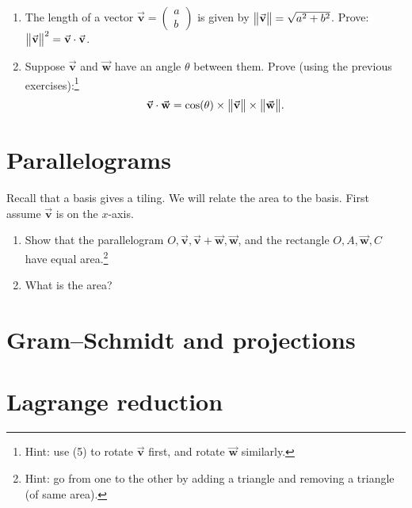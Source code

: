 \documentclass[10pt,a4paper]{article}
\newcommand{\twovec}[2]{\ensuremath{\begin{pmatrix}{#1}\\{#2}\end{pmatrix}}}
\newcommand{\V}[1]{\vec{\mathbf{#1}}}
\DeclarePairedDelimiter{\norm}{\big\lVert}{\big\rVert}
\begin{document}
\begin{enumerate}[label=(\arabic*)]
\item The length of a vector \(\V{v} = \twovec{a}{b}\) is given by \(\norm{\V{v}} = \sqrt{a^2 + b^2}\).
	Prove: \(\norm{\V{v}}^2 = \V{v} \cdot \V{v}\).

\item Suppose \(\V{v}\) and \(\V{w}\) have an angle \(\theta\) between them.
	Prove (using the previous exercises):\footnote{Hint: use (5) to rotate \(\V{v}\) first, and rotate \(\V{w}\) similarly.}
	\[\V{v} \cdot \V{w} = \cos(\theta) \times \norm{\V{v}} \times \norm{\V{w}}.\]
\end{enumerate}

\clearpage
\section{Parallelograms}
Recall that a basis gives a tiling.
We will relate the area to the basis.
First assume \(\V{v}\) is on the \(x\)-axis.

\begin{figure}[h!]
	\centering{}
\end{figure}

\begin{enumerate}[label=(\arabic*)]
\item Show that the parallelogram \(O, \V{v}, \V{v}+\V{w}, \V{w}\), and the rectangle \(O, A, \V{w}, C\) have equal area.\footnote{Hint: go from one to the other by adding a triangle and removing a triangle (of same area).}
\item What is the area?
\end{enumerate}

\section{Gram--Schmidt and projections}

\section{Lagrange reduction}
\end{document}
